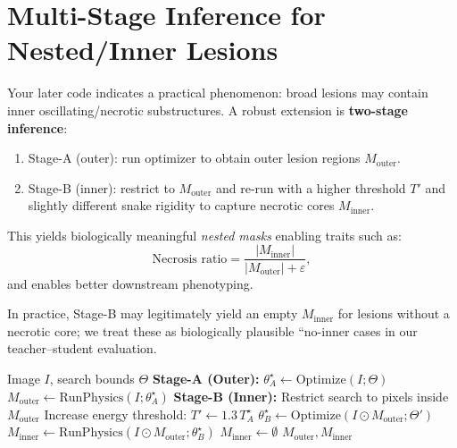 \documentclass[11pt,a4paper]{article}
\begin{document}
\section{Multi-Stage Inference for Nested/Inner Lesions}
\label{sec:multistage}
Your later code indicates a practical phenomenon: broad lesions may contain inner oscillating/necrotic substructures.
A robust extension is \textbf{two-stage inference}:
\begin{enumerate}
    \item Stage-A (outer): run optimizer to obtain outer lesion regions $M_{\text{outer}}$.
    \item Stage-B (inner): restrict to $M_{\text{outer}}$ and re-run with a higher threshold $T'$ and slightly different snake rigidity to capture necrotic cores $M_{\text{inner}}$.
\end{enumerate}
This yields biologically meaningful \emph{nested masks} enabling traits such as:
\begin{equation}
\text{Necrosis ratio} = \frac{|M_{\text{inner}}|}{|M_{\text{outer}}|+\varepsilon},
\end{equation}
and enables better downstream phenotyping.

In practice, Stage-B may legitimately yield an empty $M_{\text{inner}}$ for lesions without a necrotic core; we treat these as biologically plausible ``no-inner cases in our teacher--student evaluation.

\begin{algorithm}
\caption{Two-Stage Nested Lesion Inference}
\label{alg:two_stage}
\begin{algorithmic}[1]
\REQUIRE Image $I$, search bounds $\Theta$
\STATE \textbf{Stage-A (Outer):} $\theta_A^\star \leftarrow \mathrm{Optimize}(I;\Theta)$
\STATE $M_{\text{outer}} \leftarrow \mathrm{RunPhysics}(I;\theta_A^\star)$ 
    \STATE \textbf{Stage-B (Inner):} Restrict search to pixels inside $M_{\text{outer}}$
    \STATE Increase energy threshold: $T' \leftarrow 1.3\,T_A^\star$
    \STATE $\theta_B^\star \leftarrow \mathrm{Optimize}(I \odot M_{\text{outer}};\Theta')$
    \STATE $M_{\text{inner}} \leftarrow \mathrm{RunPhysics}(I \odot M_{\text{outer}};\theta_B^\star)$ 
\ELSE
    \STATE $M_{\text{inner}} \leftarrow \emptyset$
\ENDIF
\RETURN $M_{\text{outer}}, M_{\text{inner}}$
\end{algorithmic}
\end{algorithm}
\end{document}
